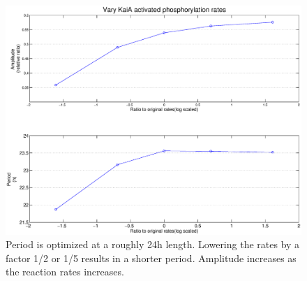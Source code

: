 \documentclass[a4paper,10pt]{article}
\numberwithin{equation}{section}
\begin{document}
\begin{figure}[H]
\centering
\includegraphics[scale=0.4]{tempcomp8.eps}
\caption{\selectfont Period is optimized at a roughly 24h length. Lowering the rates by a factor 1/2 or 1/5 results in a shorter period. Amplitude increases as the reaction rates increases.}\label{fig:tempcomp8}
\end{figure}


\end{document}
